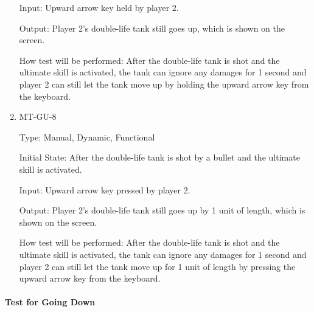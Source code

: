 \documentclass[12pt, titlepage]{article}
\begin{document}
\begin{enumerate}
Input: Upward arrow key held by player 2.
					
Output: Player 2's double-life tank still goes up, which is shown on the screen.
					
How test will be performed: After the double-life tank is shot and the ultimate skill is activated, the tank can ignore any damages for 1 second and player 2 can still let the tank move up by holding the upward arrow key from the keyboard.

\item{MT-GU-8\\}

Type: Manual, Dynamic, Functional
					
Initial State: After the double-life tank is shot by a bullet and the ultimate skill is activated.
					
Input: Upward arrow key pressed by player 2.
					
Output: Player 2's double-life tank still goes up by 1 unit of length, which is shown on the screen.
					
How test will be performed: After the double-life tank is shot and the ultimate skill is activated, the tank can ignore any damages for 1 second and player 2 can still let the tank move up for 1 unit of length by pressing the upward arrow key from the keyboard.

\end{enumerate}

\paragraph{Test for Going Down}
\end{document}

